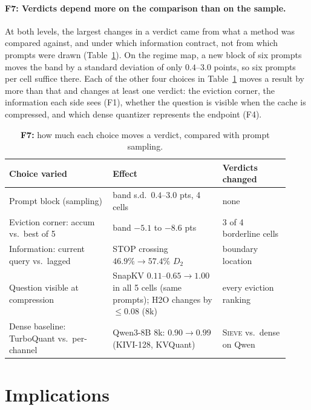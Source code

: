 \documentclass{article}
\newcommand{\sieve}{\textsc{Sieve}}
\theoremstyle{definition}
\begin{document}
\paragraph{F7: Verdicts depend more on the comparison than on the sample.}
At both levels, the largest changes in a verdict came from what a method was compared against, and under which information contract, not from which prompts were drawn (Table~\ref{tab:contract}).  On the regime map, a new block of six prompts moves the band by a standard deviation of only $0.4$--$3.0$ points, so six prompts per cell suffice there.  Each of the other four choices in Table~\ref{tab:contract} moves a result by more than that and changes at least one verdict: the eviction corner, the information each side sees (F1), whether the question is visible when the cache is compressed, and which dense quantizer represents the endpoint (F4).
\begin{table}[t]
\centering
\small
\setlength{\tabcolsep}{4pt}
\caption{\textbf{F7:} how much each choice moves a verdict, compared with prompt sampling.}
\label{tab:contract}
\begin{tabular}{@{}p{0.34\linewidth}p{0.36\linewidth}p{0.22\linewidth}@{}}
\toprule
\textbf{Choice varied} & \textbf{Effect} & \textbf{Verdicts changed} \\
\midrule
Prompt block (sampling) & band s.d.\ $0.4$--$3.0$ pts, 4 cells & none \\
Eviction corner: accum vs.\ best of 5 & band $-5.1$ to $-8.6$ pts & 3 of 4 borderline cells \\
Information: current query vs.\ lagged & STOP crossing $46.9\%\to57.4\%$ $D_2$ & boundary location \\
Question visible at compression & SnapKV $0.11$--$0.65\to1.00$ in all 5 cells (same prompts); H2O changes by $\le0.08$ (8k) & every eviction ranking \\
Dense baseline: TurboQuant vs.\ per-channel & Qwen3-8B 8k: $0.90\to0.99$ (KIVI-128, KVQuant) & \sieve{} vs.\ dense on Qwen \\
\bottomrule
\end{tabular}
\vspace{-2mm}
\end{table}


\section{Implications}
\label{sec:implications}
\end{document}
